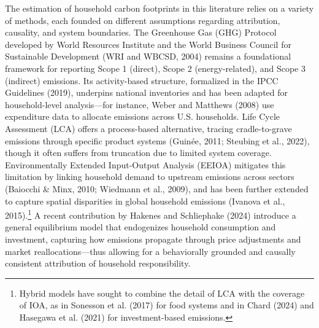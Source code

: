 \documentclass[12pt,a4paper]{article}%
\begin{document}
The estimation of household carbon footprints in this literature relies on a variety of methods, each founded on different assumptions regarding attribution, causality, and system boundaries. The Greenhouse Gas (GHG) Protocol developed by World Resources Institute and the World Business Council for Sustainable Development (WRI and WBCSD, 2004) remains a foundational framework for reporting Scope 1 (direct), Scope 2 (energy-related), and Scope 3 (indirect) emissions. Its activity-based structure, formalized in the IPCC Guidelines (2019), underpins national inventories and has been adapted for household-level analysis---for instance, Weber and Matthews (2008) use expenditure data to allocate emissions across U.S. households. Life Cycle Assessment (LCA) offers a process-based alternative, tracing cradle-to-grave emissions through specific product systems (Guinée, 2011; Steubing et al., 2022), though it often suffers from truncation due to limited system coverage. Environmentally Extended Input-Output Analysis (EEIOA) mitigates this limitation by linking household demand to upstream emissions across sectors (Baiocchi \& Minx, 2010; Wiedmann et al., 2009), and has been further extended to capture spatial disparities in global household emissions (Ivanova et al., 2015).\footnote{Hybrid models have sought to combine the detail of LCA with the coverage of IOA, as in Sonesson et al. (2017) for food systems and in Chard (2024) and Hasegawa et al. (2021) for investment-based emissions.} A recent contribution by Hakenes and Schliephake (2024) introduce a general equilibrium model that endogenizes household consumption and investment, capturing how emissions propagate through price adjustments and market reallocations---thus allowing for a behaviorally grounded and causally consistent attribution of household responsibility.
\end{document}

